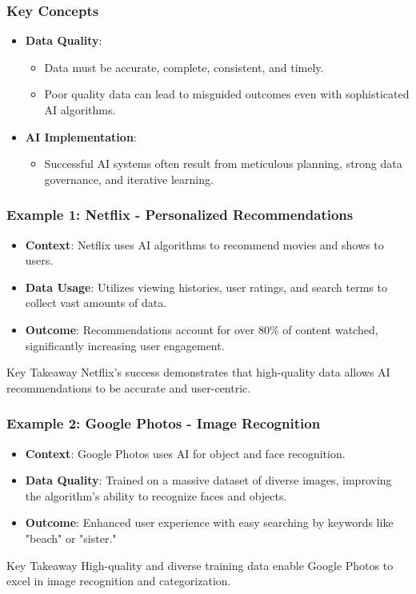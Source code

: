 \documentclass[aspectratio=169]{beamer}
\begin{document}
\begin{frame}[fragile]
    \frametitle{Key Concepts}
    \begin{itemize}
        \item \textbf{Data Quality}: 
        \begin{itemize}
            \item Data must be accurate, complete, consistent, and timely. 
            \item Poor quality data can lead to misguided outcomes even with sophisticated AI algorithms.
        \end{itemize}
        \item \textbf{AI Implementation}: 
        \begin{itemize}
            \item Successful AI systems often result from meticulous planning, strong data governance, and iterative learning.
        \end{itemize}
    \end{itemize}
\end{frame}

\begin{frame}[fragile]
    \frametitle{Example 1: Netflix - Personalized Recommendations}
    \begin{itemize}
        \item \textbf{Context}: Netflix uses AI algorithms to recommend movies and shows to users.
        \item \textbf{Data Usage}: Utilizes viewing histories, user ratings, and search terms to collect vast amounts of data.
        \item \textbf{Outcome}: Recommendations account for over 80\% of content watched, significantly increasing user engagement.
    \end{itemize}
    \begin{block}{Key Takeaway}
        Netflix's success demonstrates that high-quality data allows AI recommendations to be accurate and user-centric.
    \end{block}
\end{frame}

\begin{frame}[fragile]
    \frametitle{Example 2: Google Photos - Image Recognition}
    \begin{itemize}
        \item \textbf{Context}: Google Photos uses AI for object and face recognition.
        \item \textbf{Data Quality}: Trained on a massive dataset of diverse images, improving the algorithm's ability to recognize faces and objects.
        \item \textbf{Outcome}: Enhanced user experience with easy searching by keywords like "beach" or "sister."
    \end{itemize}
    \begin{block}{Key Takeaway}
        High-quality and diverse training data enable Google Photos to excel in image recognition and categorization.
    \end{block}
\end{frame}
\end{document}
